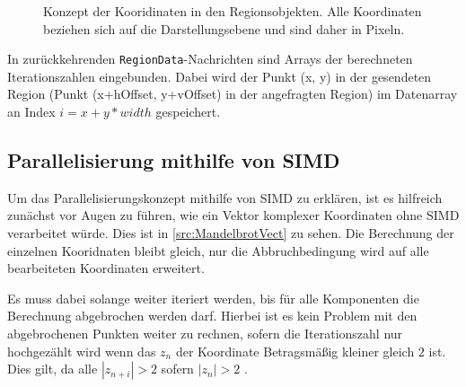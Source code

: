 \begin{figure}
	
\end{figure}
\begin{figure}
	\caption{Konzept der Kooridinaten in den Regionsobjekten. Alle Koordinaten beziehen sich auf die Darstellungsebene und sind daher in Pixeln.}
	\label{fig:concept_coordinates}
\end{figure}

In zurückkehrenden \verb|RegionData|-Nachrichten sind Arrays der berechneten Iterationszahlen eingebunden.
Dabei wird der Punkt (x, y) in der gesendeten Region (Punkt (x+hOffset, y+vOffset) in der angefragten Region)
im Datenarray an Index $i = x + y * width$ gespeichert.

\subsection{Parallelisierung mithilfe von SIMD}

Um das Parallelisierungskonzept mithilfe von SIMD zu erklären,
ist es hilfreich zunächst vor Augen zu führen, wie ein Vektor komplexer Koordinaten ohne SIMD verarbeitet würde.
Dies ist in \autoref{src:MandelbrotVect} zu sehen.
Die Berechnung der einzelnen Kooridnaten bleibt gleich, nur die Abbruchbedingung wird auf alle bearbeiteten Koordinaten erweitert.

Es muss dabei solange weiter iteriert werden, bis für alle Komponenten die Berechnung abgebrochen werden darf.
Hierbei ist es kein Problem mit den abgebrochenen Punkten weiter zu rechnen, sofern die
Iterationszahl nur hochgezählt wird wenn das $z_n$ der Koordinate Betragsmäßig kleiner gleich $2$ ist.
Dies gilt, da alle $|z_{n+i}| > 2$ sofern $|z_n| > 2$ \cite{424331}.

